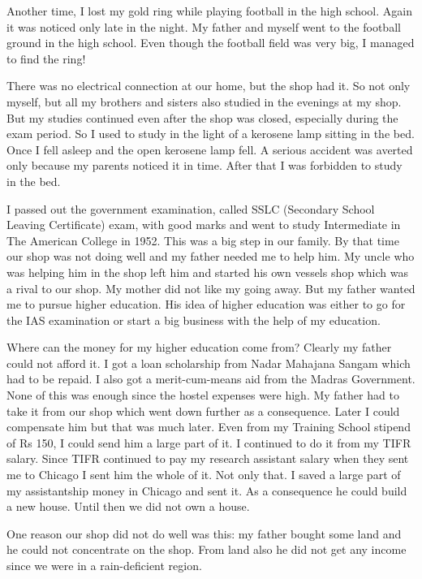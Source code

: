 Another time, I lost my gold ring while playing football in the high 
school. Again it was noticed only late in the night. My father and 
myself went to the football ground in the high school. Even though the 
football field was very big, I managed to find the ring!

There was no electrical connection at our home, but the shop had it. So 
not only myself, but all my brothers and sisters also studied in the 
evenings at my shop. But my studies continued even after the shop was 
closed, especially during the exam period. So I used to study in the 
light of a kerosene lamp sitting in the bed. Once I fell asleep and the 
open kerosene lamp fell. A serious accident was averted only because my 
parents noticed it in time. After that I was forbidden to study in the 
bed.

I passed out the government examination, called SSLC (Seco\-ndary School 
Leaving Certificate) exam, with good marks and went to study 
Intermediate in The American College in 1952. This was a big step in our 
family. By that time our shop was not doing well and my father needed me 
to help him. My uncle who was helping him in the shop left him and 
started his own vessels shop which was a rival to our shop. My mother 
did not like my going away. But my father wanted me to pursue higher 
education. His idea of higher education was either to go for the IAS 
examination or start a big business with the help of my education.

Where can the money for my higher education come from? Clearly my father 
could not afford it. I got a loan scholarship from Nadar Mahajana Sangam 
which had to be repaid. I also got a merit-cum-means aid from the Madras 
Government. None of this was enough since the hostel expenses were high. 
My father had to take it from our shop which went down further as a 
consequence. Later I could compensate him but that was much later. Even 
from my Training School stipend of Rs 150, I could send him a large part 
of it. I continued to do it from my TIFR salary. Since TIFR continued to 
pay my research assistant salary when they sent me to Chicago I sent him 
the whole of it. Not only that. I saved a large part of my assistantship 
money in Chicago and sent it. As a consequence he could build a new 
house. Until then we did not own a house.


One reason our shop did not do well was this: my father bought some land 
and he could not concentrate on the shop. From land also he did not get 
any income since we were in a rain-deficient region.



